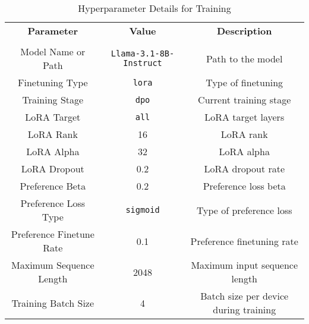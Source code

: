 \begin{table*}[ht]
   \footnotesize
    \centering
    \caption{Hyperparameter Details for Training}
    \label{tab:hyperparameters}
    \begin{tabular}{ccc}
        \toprule
        \midrule
    \textbf{Parameter}               & \textbf{Value}                                  & \textbf{Description}                                  \\
    \\\midrule
    Model Name or Path               & \texttt{Llama-3.1-8B-Instruct}                  & Path to the model                                     \\
    Finetuning Type                  & \texttt{lora}                                   & Type of finetuning                                   \\ 
    Training Stage                   & \texttt{dpo}                                    & Current training stage                               \\ 
    LoRA Target                      & \texttt{all}                                    & LoRA target layers                                  \\  
    LoRA Rank                        & 16                                              & LoRA rank                                           \\  
    LoRA Alpha                       & 32                                              & LoRA alpha                                          \\  
    LoRA Dropout                     & 0.2                                             & LoRA dropout rate                                   \\  
    Preference Beta                  & 0.2                                             & Preference loss beta                                \\  
    Preference Loss Type             & \texttt{sigmoid}                                & Type of preference loss                             \\  
    Preference Finetune Rate         & 0.1                                             & Preference finetuning rate                         \\ 
    Maximum Sequence Length          & 2048                                            & Maximum input sequence length                      \\  
    Training Batch Size              & 4                                               & Batch size per device during training             \\  

\end{tabular}
\end{table*}
